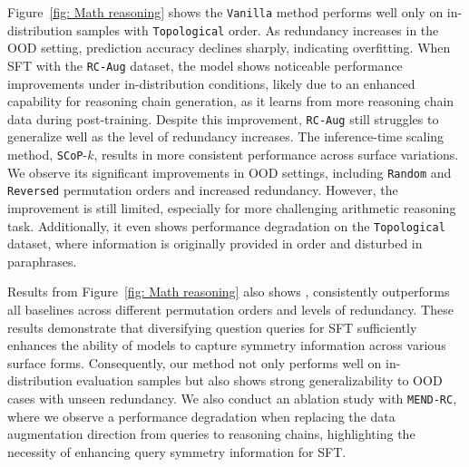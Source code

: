 Figure~\ref{fig: Math reasoning} shows the \texttt{Vanilla} method performs well only on in-distribution samples with \texttt{Topological} order. As redundancy increases in the OOD setting, prediction accuracy declines sharply, indicating overfitting. When SFT with the \texttt{RC-Aug} dataset, the model shows noticeable performance improvements under in-distribution conditions, likely due to an enhanced capability for reasoning chain generation, as it learns from more reasoning chain data during post-training. Despite this improvement, \texttt{RC-Aug} still struggles to generalize well as the level of redundancy increases.  
The inference-time scaling method, \texttt{SCoP}-$k$, results in more consistent performance across surface variations. We observe its significant improvements in OOD settings, including \texttt{Random} and \texttt{Reversed} permutation orders and increased redundancy. However, the improvement is still limited, especially for more challenging arithmetic reasoning task. Additionally, it even shows performance degradation on the \texttt{Topological} dataset, where information is originally provided in order and disturbed in paraphrases.

Results from Figure~\ref{fig: Math reasoning} also shows \method, consistently outperforms all baselines across different permutation orders and levels of redundancy. These results demonstrate that diversifying question queries for SFT sufficiently enhances the ability of models to capture symmetry information across various surface forms. Consequently, our method not only performs well on in-distribution evaluation samples but also shows strong generalizability to OOD cases with unseen redundancy.  
We also conduct an ablation study with \texttt{MEND-RC}, where we observe a performance degradation when replacing the data augmentation direction from queries to reasoning chains, highlighting the necessity of enhancing query symmetry information for SFT.

